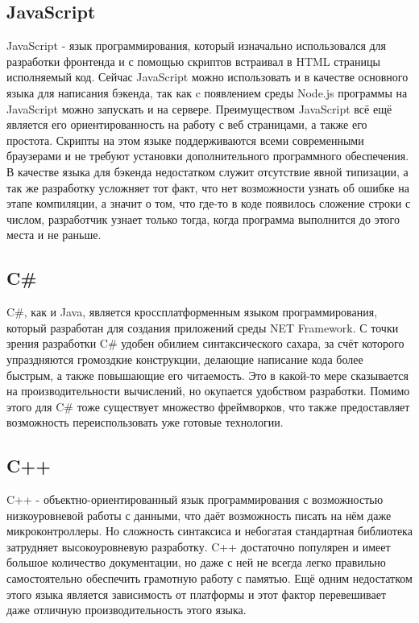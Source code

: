 \subsection{JavaScript}
JavaScript - язык программирования, который изначально использовался для разработки фронтенда и с помощью скриптов встраивал в HTML страницы исполняемый код. Сейчас JavaScript можно использовать и в качестве основного языка для написания бэкенда, так как c появлением среды Node.js программы на JavaScript можно запускать и на сервере. Преимуществом JavaScript всё ещё является его ориентированность на работу с веб страницами, а также его простота. Скрипты на этом языке поддерживаются всеми современными браузерами и не требуют установки дополнительного программного обеспечения. В качестве языка для бэкенда недостатком служит отсутствие явной типизации, а так же разработку усложняет тот факт, что нет возможности узнать об ошибке на этапе компиляции, а значит о том, что где-то в коде появилось сложение строки с числом, разработчик узнает только тогда, когда программа выполнится до этого места и не раньше. 

\subsection{C\#}
C\#, как и Java, является кроссплатформенным языком программирования, который разработан для создания приложений среды NET Framework. С точки зрения разработки C\# удобен обилием синтаксического сахара, за счёт которого упраздняются громоздкие конструкции, делающие написание кода более быстрым, а также повышающие его читаемость. Это в какой-то мере сказывается на производительности вычислений, но окупается удобством разработки. Помимо этого для C\# тоже существует множество фреймворков, что также предоставляет возможность переиспользовать уже готовые технологии.

\subsection{C++}
C++ - объектно-ориентированный язык программирования с возможностью низкоуровневой работы с данными, что даёт возможность писать на нём даже микроконтроллеры. Но сложность синтаксиса и небогатая стандартная библиотека затрудняет высокоуровневую разработку. C++ достаточно популярен и имеет большое количество документации, но даже с ней не всегда легко правильно самостоятельно обеспечить грамотную работу с памятью. Ещё одним недостатком этого языка является зависимость от платформы и этот фактор перевешивает даже отличную производительность этого языка.

